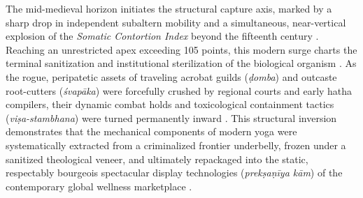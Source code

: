 \documentclass[11pt,twoside,letterpaper]{article}
\begin{document}
The mid-medieval horizon initiates the structural capture axis, marked by a sharp drop in independent subaltern mobility and a simultaneous, near-vertical explosion of the \textit{Somatic Contortion Index} beyond the fifteenth century \cite{Debnath2024, Lorenzen2011}. Reaching an unrestricted apex exceeding 105 points, this modern surge charts the terminal sanitization and institutional sterilization of the biological organism \cite{McCartney2021}. As the rogue, peripatetic assets of traveling acrobat guilds (\textit{ḍomba}) and outcaste root-cutters (\textit{śvapāka}) were forcefully crushed by regional courts and early hatha compilers, their dynamic combat holds and toxicological containment tactics (\textit{viṣa-stambhana}) were turned permanently inward \cite{Birch2024, Mallinson2017}. This structural inversion demonstrates that the mechanical components of modern yoga were systematically extracted from a criminalized frontier underbelly, frozen under a sanitized theological veneer, and ultimately repackaged into the static, respectably bourgeois spectacular display technologies (\textit{prekṣaṇīya kām}) of the contemporary global wellness marketplace \cite{Debnath2024, McCartney2021}.
\end{document}
